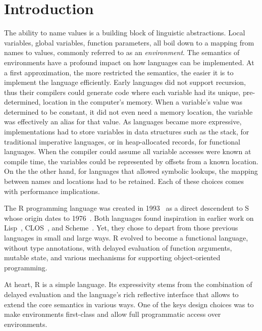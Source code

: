 \documentclass[10pt,review,sigplan,authorversion=true]{acmart}
\begin{document}
\maketitle
\section{Introduction}

The ability to name values is a building block of linguistic abstractions. Local
variables, global variables, function parameters, all boil down to a mapping
from names to values, commonly referred to as an \emph{environment}. The
semantics of environments have a profound impact on how languages can be
implemented. At a first approximation, the more restricted the semantics, the
easier it is to implement the language efficiently. Early languages did not
support recursion, thus their compilers could generate code where each variable
had its unique, pre-determined, location in the computer's memory. When a
variable's value was determined to be constant, it did not even need a memory
location, the variable was effectively an alias for that value. As languages
became more expressive, implementations had to store variables in data
structures such as the stack, for traditional imperative languages, or in
heap-allocated records, for functional languages. When the compiler could assume
all variable accesses were known at compile time, the variables could be
represented by offsets from a known location. On the the other hand, for
languages that allowed symbolic lookups, the mapping between names and locations
had to be retained. Each of these choices comes with performance implications.

The R programming language was created in 1993~\cite{r96} as a direct descendent
to S whose origin dates to 1976~\cite{s88}. Both languages found inspiration in
earlier work on Lisp~\cite{Lisp}, CLOS~\cite{CLOS}, and
Scheme~\cite{SchemeR5RS}. Yet, they chose to depart from those previous
languages in small and large ways. R evolved to become a functional language,
without type annotations, with delayed evaluation of function arguments, mutable
state, and various mechanisms for supporting object-oriented programming.

At heart, R is a simple language. Its expressivity stems from the combination of
delayed evaluation and the language's rich reflective interface that allows to
extend the core semantics in various ways. One of the keys design choices was to
make environments first-class and allow full programmatic access over
environments.
\end{document}
